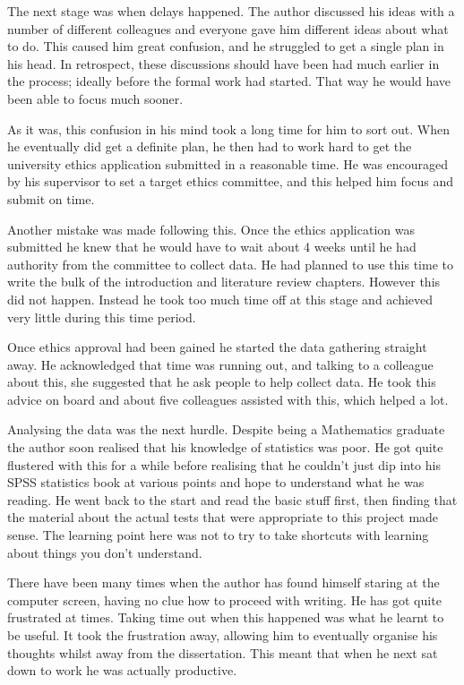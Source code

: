 \documentclass
[
	12pt,
	a4paper,
	oneside,
]{report}
\begin{document}
The next stage was when delays happened. The author discussed his ideas with
a number of different colleagues and everyone gave him different ideas about 
what to do. This caused him great confusion, and he struggled to get a single 
plan in his head. In retrospect, these discussions should have been had 
much earlier in the process; ideally before the formal work had started. That
way he would have been able to focus much sooner.

As it was, this confusion in his mind took a long time for him to sort out.
When he eventually did get a definite plan, he then had to work hard to get
the university ethics application submitted in a reasonable time. He was 
encouraged by his supervisor to set a target ethics committee, and this helped
him focus and submit on time. 

Another mistake was made following this. Once the ethics application was
submitted he knew that he would have to wait about 4 weeks until he had
authority from the committee to collect data. He had planned to use this time 
to write the bulk of the introduction and literature review chapters. However
this did not happen. Instead he took too much time off at this stage and
achieved very little during this time period. 

Once ethics approval had been gained he started the data gathering straight
away. He acknowledged that time was running out, and talking to a colleague 
about this, she suggested that he ask people to help collect data. He took
this advice on board and about five colleagues assisted with this, which
helped a lot.

Analysing the data was the next hurdle. Despite being a Mathematics graduate
the author soon realised that his knowledge of statistics was poor. He got 
quite flustered with this for a while before realising that he couldn't just
dip into his SPSS statistics book at various points and hope to understand
what he was reading. He went back to the start and read the basic stuff first,
then finding that the material about the actual tests that were appropriate to
this project made sense. The learning point here was not to try to take 
shortcuts with learning about things you don't understand.

There have been many times when the author has found himself staring at the 
computer screen, having no clue how to proceed with writing. He has got quite
frustrated at times. Taking time out when this happened was what he learnt to
be useful. It took the frustration away, allowing him to eventually organise
his thoughts whilst away from the dissertation. This meant that when he next 
sat down to work he was actually productive.
\end{document}
